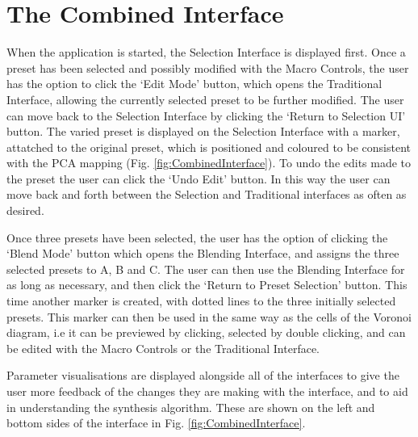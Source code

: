 \documentclass[11pt, oneside]{report}   	%
\begin{document}
\section{The Combined Interface}
When the application is started, the Selection Interface is displayed first. Once a preset has been selected and possibly modified with the Macro Controls, the user has the option to click the `Edit Mode' button, which opens the Traditional Interface, allowing the currently selected preset to be further modified. The user can move back to the Selection Interface by clicking the `Return to Selection UI' button. The varied preset is displayed on the Selection Interface with a marker, attatched to the original preset, which is positioned and coloured to be consistent with the PCA mapping (Fig. \ref{fig:CombinedInterface}). To undo the edits made to the preset the user can click the `Undo Edit' button. In this way the user can move back and forth between the Selection and Traditional interfaces as often as desired.

Once three presets have been selected, the user has the option of clicking the `Blend Mode' button which opens the Blending Interface, and assigns the three selected presets to A, B and C. The user can then use the Blending Interface for as long as necessary, and then click the `Return to Preset Selection' button. This time another marker is created, with dotted lines to the three initially selected presets. 
This marker can then be used in the same way as the cells of the Voronoi diagram, i.e it can be previewed by clicking, selected by double clicking, and can be edited with the Macro Controls or the Traditional Interface.

 Parameter visualisations are displayed alongside all of the interfaces to give the user more feedback of the changes they are making with the interface, and to aid in understanding the synthesis algorithm. These are shown on the left and bottom sides of the interface in Fig. \ref{fig:CombinedInterface}.
 
\end{document}
